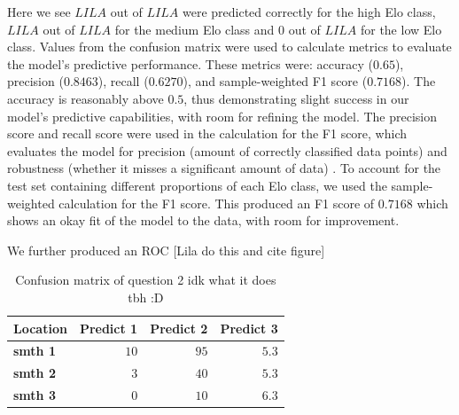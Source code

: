 \documentclass[10pt,a4paper]{article}
\begin{document}
\begin{multicols}{2}
Here we see $ LILA $ out of $LILA$ were predicted correctly for the high Elo class, $LILA$ out of $LILA$ for the medium Elo class and $0$ out of $LILA$ for the low Elo class. Values from the confusion matrix were used to calculate metrics to evaluate the model's predictive performance. These metrics were: accuracy ($0.65$), precision ($0.8463$), recall ($0.6270$), and sample-weighted F1 score ($0.7168$). The accuracy is reasonably above $0.5$, thus demonstrating slight success in our model's predictive capabilities, with room for refining the model. The precision score and recall score were used in the calculation for the F1 score, which evaluates the model for precision (amount of correctly classified data points) and robustness (whether it misses a significant amount of data) \cite{MetricsToEvaluateYourML}. To account for the test set containing different proportions of each Elo class, we used the sample-weighted calculation for the F1 score. This produced an F1 score of $0.7168$ which shows an okay fit of the model to the data, with room for improvement. \newline

We further produced an ROC [Lila do this and cite figure]

\begin{table}[H]
  \centering
  \caption{Confusion matrix of question 2 idk what it does tbh :D}
  \label{tab:confusion_matrix}
    \begin{tabular}{lrrr}
        \toprule
        \textbf{Location}&\textbf{Predict 1}&\textbf{Predict 2}&\textbf{Predict 3}\\
        \midrule
        \textbf{smth 1}&$10$&$ 95$&$5.3$\tabularnewline
        \textbf{smth 2}&$ 3$&$ 40$&$5.3$\tabularnewline
        \textbf{smth 3}&$ 0$&$ 10$&$6.3$\tabularnewline
        \hline
    \end{tabular}
\end{table}




\end{multicols}
\end{document}
